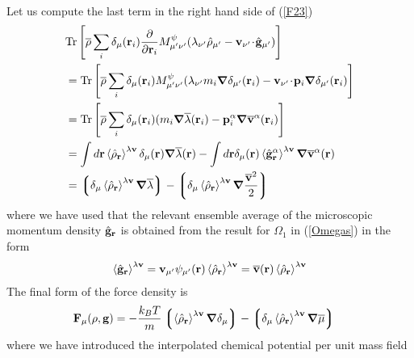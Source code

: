 \documentclass[b5paper,openright,11pt]{book}
\newcommand{\esc}{\!\cdot\!}
\newcommand{\llangle}{\left\langle}
\newcommand{\rrangle}{\right\rangle}
\newcommand{\llg}{\left\lgroup}
\newcommand{\rlg}{\right\rgroup}
\begin{document}
\begin{appendices}
\begin{align}
\label{F23}
\end{align}
Let us compute the last term in the right  hand side of (\ref{F23})
\begin{align}
  &{\rm Tr}\left[\overline{\rho}
\sum_i\delta_\mu({\bf r}_i)
\frac{\partial }{\partial {\bf r}_i}
M^\psi_{\mu'\nu'}(\lambda_{\nu'}\hat{\rho}_{\mu'}-{\bf v}_{\nu'}\esc\hat{\bf g}_{\mu'})\right] 
\nonumber \\
&={\rm Tr}\left[\overline{\rho}
\sum_i\delta_\mu({\bf r}_i)
M^\psi_{\mu'\nu'}(\lambda_{\nu'}m_i\boldsymbol{\nabla}\delta_{\mu'}({\bf r}_i)-{\bf v}_{\nu'}\esc{\bf p}_i
\boldsymbol{\nabla}\delta_{\mu'}({\bf r}_i)
\right]
\nonumber\\
&=
   {\rm Tr}\left[\overline{\rho}
\sum_i\delta_\mu({\bf r}_i)
(m_i\boldsymbol{\nabla}\overline{\lambda}({\bf r}_i)-{\bf p}_i^\alpha
\boldsymbol{\nabla}\overline{\bf v}^\alpha({\bf r}_i)
\right]
\nonumber\\
&= \int d{\bf r}\llangle \hat{\rho}_{\bf r}\rrangle^{\lambda{\bf v}}\delta_\mu({\bf r})
\boldsymbol{\nabla}\overline{\lambda}({\bf r})
- \int d{\bf r}\delta_\mu({\bf r})
\llangle \hat{\bf g}^\alpha_{\bf r}\rrangle^{\lambda{\bf v}}\boldsymbol{\nabla}\overline{\bf v}^\alpha({\bf r})
\nonumber\\
&=\llg\delta_\mu\llangle \hat{\rho}_{\bf r}\rrangle^{\lambda{\bf v}}\boldsymbol{\nabla}\overline{\lambda}\rlg
- \llg\delta_\mu\llangle\hat{\rho}_{\bf r}\rrangle^{\lambda{\bf v}}
\boldsymbol{\nabla}\frac{\overline{\bf v}^2}{2}  \rlg \label{f1}
\end{align}
where  we  have  used  that  the  relevant  ensemble  average  of  the
microscopic momentum  density $\hat{\bf  g}_{\bf r}$ is  obtained from
the result for $\Omega_1$ in (\ref{Omegas}) in the form
\begin{align}
  \llangle \hat{\bf g}_{\bf r}\rrangle^{\lambda{\bf v}}={\bf v}_{\mu'}\psi_{\mu'}({\bf r})
\llangle\hat{\rho}_{\bf r}\rrangle^{\lambda{\bf v}}=\overline{\bf v}({\bf r})\llangle\hat{\rho}_{\bf r}\rrangle^{\lambda{\bf v}}
\end{align}
The final form of the force density is 
\begin{align}
  {\bf F}_\mu(\rho,{\bf g})
  &=-\frac{k_BT}{m}\llg\llangle\hat{\rho}_{\bf r}\rrangle^{\lambda{\bf v}}
\boldsymbol{\nabla}\delta_\mu\rlg
-\llg\delta_\mu\llangle\hat{\rho}_{\bf r}\rrangle^{\lambda{\bf v}}\boldsymbol{\nabla}\overline{\mu}\rlg
\end{align} 
where we have introduced the interpolated chemical potential  per unit mass field
\begin{align}

\end{align}
\end{appendices}
\end{document}
